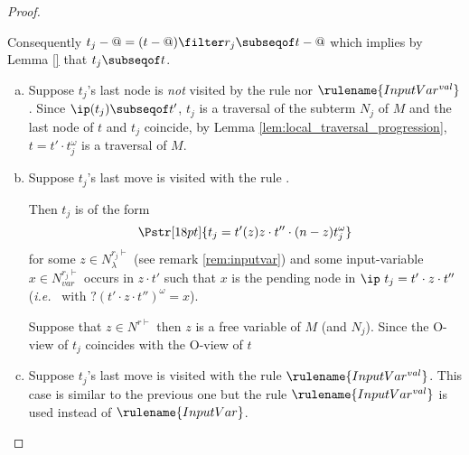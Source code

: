 \begin{proof}
\begin{enumerate}[$\bullet$]
\begin{enumerate}
\begin{enumerate}[-]
        Consequently $t_j-@ = (t-@) \filter r_j \subseqof t-@$ which implies by Lemma \ref{} that $t_j \subseqof t$.

    \begin{enumerate}[(a)]
    \item  Suppose $t_j$'s last node is \emph{not} visited by the rule  nor $\rulename{InputVar^{val}}$. Since $\ip( t_j) \subseqof t'$, $t_j$ is a traversal of the subterm $N_j$ of $M$ and the last node
        of $t$ and $t_j$ coincide, by Lemma
        \ref{lem:local_traversal_progression}, $t =
        t' \cdot t_j^\omega$ is a traversal of $M$.

    \item Suppose $t_j$'s last move is visited with the rule .

    Then $t_j$ is of the form
    $$\Pstr[18pt]{ t_j = t' (z)z \cdot t'' \cdot (n-z){t_j^\omega}}$$
for some $z \in N_\lambda^{r_j\vdash}$ (see remark
\ref{rem:inputvar}) and some input-variable $x \in
N^{r_j\vdash}_{var}$ occurs in $z\cdot t'$ such that
$x$ is
 the pending node in $\ip\ t_j = t' \cdot z \cdot
 t''$ ({\it i.e.}~ with $?(t' \cdot z \cdot
 t'')^\omega = x$).

Suppose that $z\in N^{r\vdash}$ then $z$ is a free variable of $M$ (and $N_j$).
Since the O-view of $t_j$ coincides with the O-view of $t$

    \item Suppose $t_j$'s last move is visited with the rule $\rulename{InputVar^{val}}$.
    This case is similar to the previous one but the rule $\rulename{InputVar^{val}}$ is used instead
    of $\rulename{InputVar}$.
    \end{enumerate}



\end{enumerate}
\end{enumerate}
\end{enumerate}
\end{proof}
